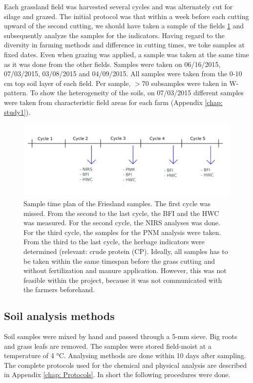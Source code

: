 \documentclass[10pt,twoside,dutch,english]{report}
\begin{document}
Each grassland field was harvested several cycles and was alternately cut for silage and grazed. The initial protocol was that within a week before each cutting upward of the second cutting, we should have taken a sample of the fields \ref{fig:mm_samples} and subsequently analyze the samples for the indicators. Having regard to the diversity in farming methods and difference in cutting times, we toke samples at fixed dates.  Even when grazing was applied, a sample was taken at the same time as it was done from the other fields. Samples were taken on 06/16/2015, 07/03/2015, 03/08/2015 and 04/09/2015. All samples were taken from the 0-10 cm top soil layer of each field. Per sample, $>$70 subsamples were taken in W-pattern. To show the heterogeneity of the soils, on 07/03/2015 different samples were taken from characteristic field areas for each farm (Appendix \ref{chap: study1}).

\begin{figure}[h] %
	\includegraphics[width=1\linewidth]{mm_samples}
	\caption{Sample time plan of the Friesland samples. The first cycle was missed. From the second to the last cycle, the BFI and the HWC was measured. For the second cycle, the NIRS analyses was done. For the third cycle, the samples for the PNM analysis were taken. From the third to the last cycle, the herbage indicators were determined (relevant: crude protein (CP). Ideally, all samples has to be taken within the same timespan before the grass cutting and without fertilization and manure application. However, this was not feasible within the project, because it was not communicated with the farmers beforehand.}
	\label{fig:mm_samples}
\end{figure}

\subsection{Soil analysis methods}
Soil samples were mixed by hand and passed through a 5-mm sieve. Big roots and grass leafs are removed. The samples were stored field-moist at a temperature of 4 °C. Analysing methods are done within 10 days after sampling. 
The complete protocols used for the chemical and physical analysis are described in Appendix \ref{chap: Protocols}. In short the following procedures were done. 
\end{document}
